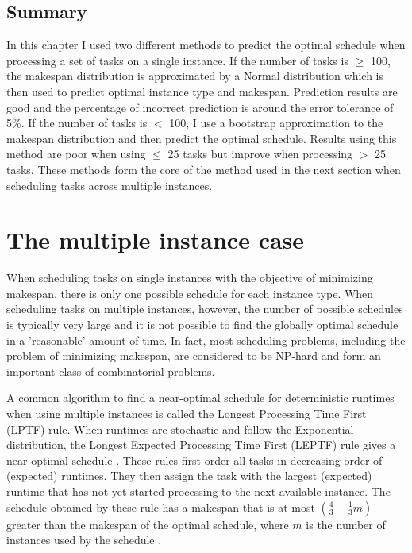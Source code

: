 \documentclass[12pt]{report}
\begin{document}
\section{Summary}
In this chapter I used two different methods to predict the optimal schedule when processing a set of tasks on a single instance. 
If the number of tasks is $\geq$ 100, the makespan distribution is approximated by a Normal distribution which is then used to predict optimal instance type and makespan. 
Prediction results are good and the percentage of incorrect prediction is around the error tolerance of 5\%. 
If the number of tasks is $<$ 100, I use a bootstrap approximation to the makespan distribution and then predict the optimal schedule. 
Results using this method are poor when using $\leq$ 25 tasks but improve when processing $>$ 25 tasks.
These methods form the core of the method used in the next section when scheduling tasks across multiple instances.

\chapter{The multiple instance case}

When scheduling tasks on single instances with the objective of minimizing makespan, there is only one possible schedule for each instance type.
When scheduling tasks on multiple instances, however, the number of possible schedules is typically very large and it is not possible to find the globally optimal schedule in a 'reasonable' amount of time.
In fact, most scheduling problems, including the problem of minimizing makespan, are considered to be NP-hard \cite{Garey1979} and form an important class of combinatorial problems.

A common algorithm to find a near-optimal schedule for deterministic runtimes when using multiple instances is called the Longest Processing Time First (LPTF) rule.
When runtimes are stochastic and follow the Exponential distribution, the Longest Expected Processing Time First (LEPTF) rule gives a near-optimal schedule \cite{Pinedo2012}. 
These rules first order all tasks in decreasing order of (expected) runtimes.
They then assign the task with the largest (expected) runtime that has not yet started processing to the next available instance. 
The schedule obtained by these rule has a makespan that is at most $\left(\frac{4}{3} - \frac{1}{3}m \right)$ greater than the makespan of the optimal schedule, where $m$ is the number of instances used by the schedule \cite{Graham1969}.
\end{document}
